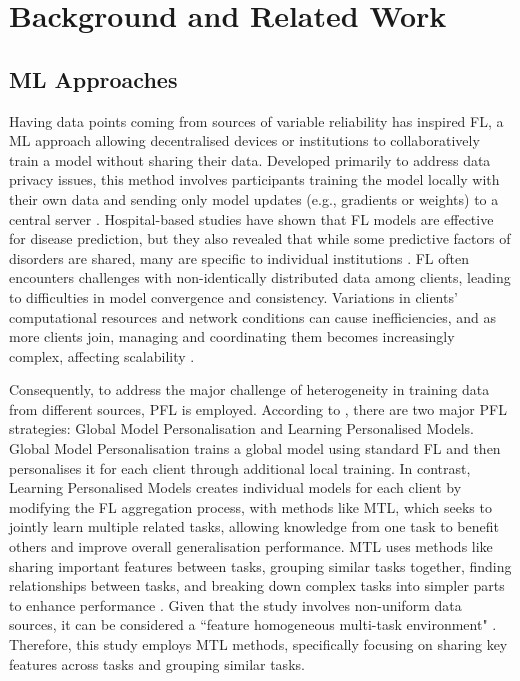 \section{Background and Related Work}
\subsection{ML Approaches}

Having data points coming from sources of variable reliability has inspired \gls{FL}, a \gls{ML} approach allowing decentralised devices or institutions to collaboratively train a model without sharing their data. Developed primarily to address data privacy issues, this method involves participants training the model locally with their own data and sending only model updates (e.g., gradients or weights) to a central server \cite{kairouz2021_FL}. 
Hospital-based studies have shown that \gls{FL} models are effective for disease prediction, but they also revealed that while some predictive factors of disorders are shared, many are specific to individual institutions \cite{oh2018_two_hospitals}. \gls{FL} often encounters challenges with non-identically distributed data among clients, leading to difficulties in model convergence and consistency. Variations in clients' computational resources and network conditions can cause inefficiencies, and as more clients join, managing and coordinating them becomes increasingly complex, affecting scalability \cite{kairouz2021_FL}.

Consequently, to address the major challenge of heterogeneity in training data from different sources, \gls{PFL} is employed. According to \cite{tan2022_PFL}, there are two major \gls{PFL} strategies: Global Model Personalisation and Learning Personalised Models. Global Model Personalisation trains a global model using standard \gls{FL} and then personalises it for each client through additional local training. In contrast, Learning Personalised Models creates individual models for each client by modifying the \gls{FL} aggregation process, with methods like \gls{MTL}, which seeks to jointly learn multiple related tasks, allowing knowledge from one task to benefit others and improve overall generalisation performance. \gls{MTL} uses methods like sharing important features between tasks, grouping similar tasks together, finding relationships between tasks, and breaking down complex tasks into simpler parts to enhance performance \cite{zhang2021survey_multitask_learning}. Given that the study involves non-uniform data sources, it can be considered a ``feature homogeneous multi-task environment" \cite{alex_sources}. Therefore, this study employs \gls{MTL} methods, specifically focusing on sharing key features across tasks and grouping similar tasks.

